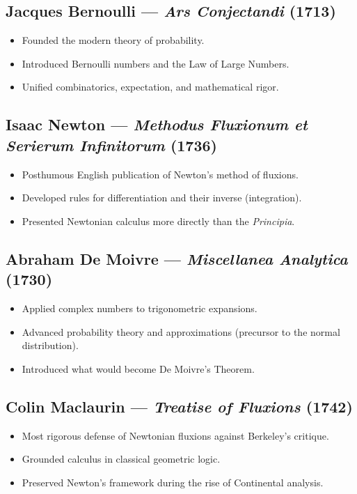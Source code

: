 \documentclass[9pt]{article}
\begin{document}
\subsection*{Jacques Bernoulli — \textit{Ars Conjectandi} (1713)}
\begin{itemize}
  \item Founded the modern theory of probability.
  \item Introduced Bernoulli numbers and the Law of Large Numbers.
  \item Unified combinatorics, expectation, and mathematical rigor.
\end{itemize}

\subsection*{Isaac Newton — \textit{Methodus Fluxionum et Serierum Infinitorum} (1736)}
\begin{itemize}
  \item Posthumous English publication of Newton’s method of fluxions.
  \item Developed rules for differentiation and their inverse (integration).
  \item Presented Newtonian calculus more directly than the \textit{Principia}.
\end{itemize}

\subsection*{Abraham De Moivre — \textit{Miscellanea Analytica} (1730)}
\begin{itemize}
  \item Applied complex numbers to trigonometric expansions.
  \item Advanced probability theory and approximations (precursor to the normal distribution).
  \item Introduced what would become De Moivre’s Theorem.
\end{itemize}

\subsection*{Colin Maclaurin — \textit{Treatise of Fluxions} (1742)}
\begin{itemize}
  \item Most rigorous defense of Newtonian fluxions against Berkeley’s critique.
  \item Grounded calculus in classical geometric logic.
  \item Preserved Newton’s framework during the rise of Continental analysis.
\end{itemize}
\end{document}
